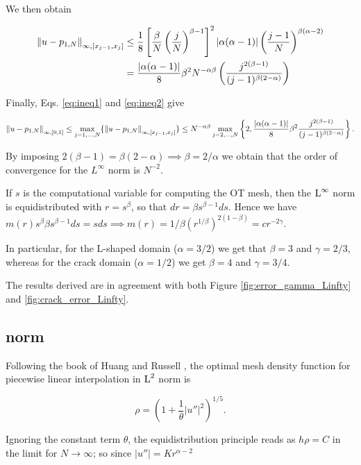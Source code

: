 \documentclass[a4paper,11pt]{article}
\begin{document}
We then obtain 

\begin{equation}
\label{eq:ineq2}
\begin{split}
  \left\|u - p_{1,N}\right\|_{\infty,[x_{j-1},x_{j}]} &\leq \frac{1}{8} \left[ \frac{\beta}{N} \left(\frac{j}{N}\right)^{\beta - 1} \right]^{2} |\alpha(\alpha - 1)| \left(\frac{j-1}{N}  \right)^{\beta(\alpha -2)}\\
  &=\frac{|\alpha(\alpha - 1)|}{8} \beta^{2} N^{-\alpha \beta} \left( \frac{j^{2(\beta - 1)}}{(j-1)^{\beta(2-\alpha)}}\right)
\end{split}
\end{equation}

Finally, Eqs. \eqref{eq:ineq1} and  \eqref{eq:ineq2} give

$$\left\|u - p_{1,N}\right\|_{\infty,[0,1]} \leq \max_{j=1,\dots,N} \{ \left\|u - p_{1,N}\right\|_{\infty,[x_{j-1},x_{j}]}\} \leq N^{-\alpha \beta} \max_{j=2,\dots,N} \left\{2, \frac{|\alpha(\alpha - 1)|}{8} \beta^{2} \frac{j^{2(\beta - 1)}}{(j-1)^{\beta(2-\alpha)}}\right\}.$$

By imposing $2(\beta - 1) = \beta(2-\alpha) \implies \beta = 2/\alpha $ we obtain that the order of convergence for the $L^{\infty}$ norm is $N^{-2}$.

If $s$ is the computational variable for computing the OT mesh, then the $\operatorname L^{\infty}$ norm is equidistributed with $r = s^{\beta}$, so that $dr = \beta s^{\beta - 1} ds$. Hence we have $m(r) s^{\beta} \beta s^{\beta-1} ds = s ds \implies m(r) = 1/\beta (r^{1/\beta})^{2(1-\beta)} = c r^{-2\gamma}$.

In particular, for the L-shaped domain ($\alpha = 3/2$) we get that $\beta = 3$ and $\gamma = 2/3$, whereas for the crack domain ($\alpha = 1/2$) we get $\beta = 4$ and $\gamma = 3/4$.

The results derived are in agreement with both Figure \ref{fig:error_gamma_Linfty} and \ref{fig:crack_error_Linfty}.  

\subsection{ norm}

Following the book of Huang and Russell \cite{HR:2011}, the optimal mesh density function for piecewise linear interpolation in $\operatorname L^{2}$ norm is

$$\rho = \left(1 + \frac{1}{\theta}|u''|^{2} \right)^{1/5}.$$

Ignoring the constant term $\theta$, the equidistribution principle reads as $h\rho = C$ in the limit for $N \rightarrow \infty$; so since $|u''| = Kr^{\alpha - 2}$
\end{document}
